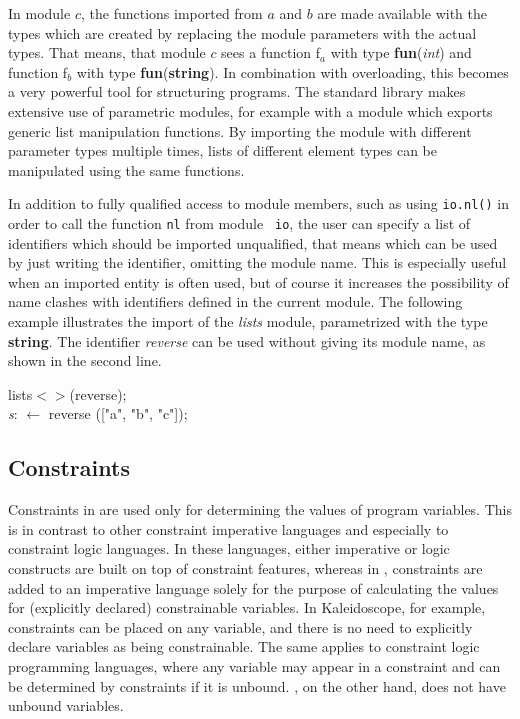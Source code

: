 In module $c$, the functions imported from $a$ and $b$ are made
available with the types which are created by replacing the module
parameters with the actual types.  That means, that module $c$ sees a
function f${}_a$ with type {\bf fun}({\em int}) and function f${}_b$
with type {\bf fun}({\bf string}).  In combination with overloading,
this becomes a very powerful tool for structuring programs.  The
\turtle{} standard library makes extensive use of parametric modules,
for example with a module which exports generic list manipulation
functions.  By importing the module with different parameter types
multiple times, lists of different element types can be manipulated
using the same functions.

In addition to fully qualified access to module members, such as using
{\tt io.nl()} in order to call the function {\tt nl} from module {\tt
  io}, the user can specify a list of identifiers which should be
imported unqualified, that means which can be used by just writing the
identifier, omitting the module name.  This is especially useful when
an imported entity is often used, but of course it increases the
possibility of name clashes with identifiers defined in the current
module.  The following example illustrates the import of the {\em
  lists} module, parametrized with the type {\bf string}. The
identifier {\em reverse} can be used without giving its module name,
as shown in the second line.

\begin{ttlprog}
\>\ttlImport{} lists$<$\ttlString{}$>$(reverse);\\
\>\ttlVar{} {\em s}: \ttlList{} \ttlOf{} \ttlString{} $\leftarrow$ reverse (["a", "b", "c"]);\\
\end{ttlprog}


\subsection{Constraints}
\label{sec:turtle-constraints}

Constraints in \turtle{} are used only for determining the values of
program variables.  This is in contrast to other constraint imperative
languages and especially to constraint logic languages.  In these
languages, either imperative or logic constructs are built on top of
constraint features, whereas in \turtle{}, constraints are added to an
imperative language solely for the purpose of calculating the values
for (explicitly declared) constrainable variables. In Kaleidoscope,
for example, constraints can be placed on any variable, and there is
no need to explicitly declare variables as being constrainable.  The
same applies to constraint logic programming languages, where any
variable may appear in a constraint and can be determined by
constraints if it is unbound.  \turtle{}, on the other hand, does not
have unbound variables.

